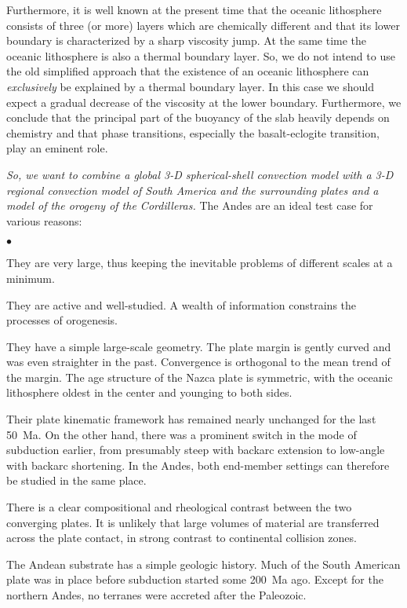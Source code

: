 \documentclass[twoside,10pt]{article}
\newenvironment{dlist}
   {\begin{list}
      {$\bullet$}
      {
      \setlength{\topsep}{0.5ex}
      \setlength{\partopsep}{0.0ex}
      \setlength{\parsep}{0.5ex}
      \setlength{\itemsep}{0.0ex}
      \setlength{\itemindent}{3.0ex}
      \setlength{\leftmargin}{0.0ex}
      \setlength{\labelsep}{1.0ex}
      }
   }
   {\end{list}}
\begin{document}
Furthermore, it is well known at the present time that the oceanic lithosphere consists of three (or more) layers which are chemically different and that its lower boundary is characterized by a sharp viscosity jump.
At the same time the oceanic lithosphere is also a thermal boundary layer. 
So, we do not intend to use the old simplified approach that the existence of an oceanic lithosphere can \emph{exclusively} be explained by a thermal boundary layer.
In this case we should expect a gradual decrease of the viscosity at the lower boundary. 
Furthermore, we conclude that the principal part of the buoyancy of the slab heavily depends on chemistry and that phase transitions, especially the basalt-eclogite transition, play an eminent role.

\emph{So, we want to combine a global 3-D spherical-shell convection model with a 3-D regional convection model of South America and the surrounding plates and a model of the orogeny of the Cordilleras.}
The Andes are an ideal test case for various reasons:
\begin{dlist}
 \item They are very large, thus keeping the inevitable problems of different scales at a minimum. 
 \item They are active and well-studied. A wealth of information constrains the processes of orogenesis.
 \item They have a simple large-scale geometry. The plate margin is gently curved and was even straighter in the past. Convergence is orthogonal to the mean trend of the margin. 
The age structure of the Nazca plate is symmetric, with the oceanic lithosphere oldest in the center and younging to both sides. 
 \item Their plate kinematic framework has remained nearly unchanged for the last 50~Ma. 
On the other hand, there was a prominent switch in the mode of subduction earlier, from presumably steep with backarc extension to low-angle with backarc shortening. 
In the Andes, both end-member settings can therefore be studied in the same place. 
 \item There is a clear compositional and rheological contrast between the two converging plates. 
It is unlikely that large volumes of material are transferred across the plate contact, in strong contrast to continental collision zones. 
 \item The Andean substrate has a simple geologic history. 
Much of the South American plate was in place before subduction started some 200~Ma ago. 
Except for the northern Andes, no terranes were accreted after the Paleozoic.
\end{dlist}
\end{document}
